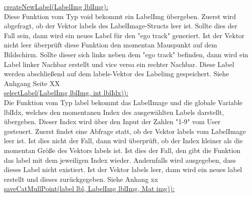 \documentclass[11pt]{scrartcl}
\begin{document}
\noindent
\underline{createNewLabel(LabelImg lblImg):}
\\

\noindent
Diese Funktion vom Typ void bekommt ein LabelImg übergeben. Zuerst wird abgefragt, ob der Vektor labels des LabelImage-Structs leer ist. Sollte dies der Fall sein, dann wird ein neues Label für den "ego track" generiert. Ist der Vektor nicht leer überprüft diese Funktion den momentan Mauspunkt auf dem Bildschirm. Sollte dieser sich links neben dem "ego track" befinden, dann wird ein Label linker Nachbar erstellt und vice versa ein rechter Nachbar. Diese Label werden abschließend auf dem labels-Vektor des Labelimg gespeichert.
Siehe Anhgang Seite XX
\\

\noindent
\underline{selectLabel(LabelImg lblImg, int lblIdx)):}
\\

\noindent
Die Funktion vom Typ label bekommt das LabelImage und die globale Variable lblIdx, welches den momentanen Index des ausgewählten Labels darstellt, übergeben. Dieser Index wird über den Input der Zahlen "1-9" vom User gesteuert. Zuerst findet eine Abfrage statt, ob der Vektor labels vom LabelImage leer ist. Ist dies nicht der Fall, dann wird überprüft, ob der Index kleiner als die momentan Größe des Vektors labels ist. Ist dies der Fall, den gibt die Funktion das label mit dem jeweiligen Index wieder. Andernfalls wird ausgegeben, dass dieses Label nicht existiert. Ist der Vektor labels leer, dann wird ein neues label erstellt und dieses zurückgegeben.
Siehe Anhang xx
\\

\noindent
\underline{saveCatMullPoint(label lbl, LabelImg lblImg, Mat img)):}
\\
\end{document}
